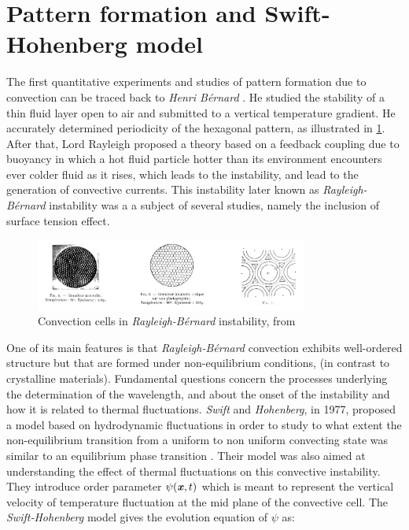 \documentclass[11pt]{article}
\begin{document}
\section{Pattern formation and Swift-Hohenberg model}
The first quantitative experiments and studies of pattern formation due to convection can be traced back to \emph{Henri Bérnard} \parencite{benardtourbillonscellulaires1901}. He studied the stability of a thin fluid layer open to air and submitted to a vertical temperature gradient. He accurately determined periodicity of the hexagonal pattern, as illustrated in \cref{fig:bernard}. After that, Lord Rayleigh \parencite{rayleighLIXconvection1916} proposed a theory based on a feedback coupling due to buoyancy in which a hot fluid particle hotter than its environment encounters ever colder fluid as it rises, which leads to the instability, and lead to the generation of convective currents. This instability later known as \emph{Rayleigh-Bérnard} instability was a a subject of several studies, namely the inclusion of surface tension effect.
\begin{figure}[H]
    \centering
    \includegraphics[width=0.8\textwidth]{imgs/pfc/bernard.png}
    \caption{Convection cells in \emph{Rayleigh-Bérnard} instability, from \parencite{benardtourbillonscellulaires1901}}\label{fig:bernard}
\end{figure}
One of its main features is that \emph{Rayleigh-Bérnard} convection exhibits well-ordered structure but that are formed under non-equilibrium conditions, (in contrast to crystalline materials). Fundamental questions concern the processes underlying the determination of the wavelength, and about the onset of the instability and how it is related to thermal fluctuations. \emph{Swift} and \emph{Hohenberg}, in 1977, proposed a model based on hydrodynamic fluctuations in order to study to what extent the non-equilibrium transition from a uniform to non uniform convecting state was similar to an equilibrium phase transition \parencite{swiftHydrodynamicfluctuations1977}. Their model was also aimed at understanding the effect of thermal fluctuations on this convective instability. They introduce order parameter $\psi(\bm{\mathit{x}},t)$ which is meant to represent the vertical velocity of temperature fluctuation at the mid plane of the convective cell. The \emph{Swift-Hohenberg} model gives the evolution equation of $\psi$ as:
\end{document}
